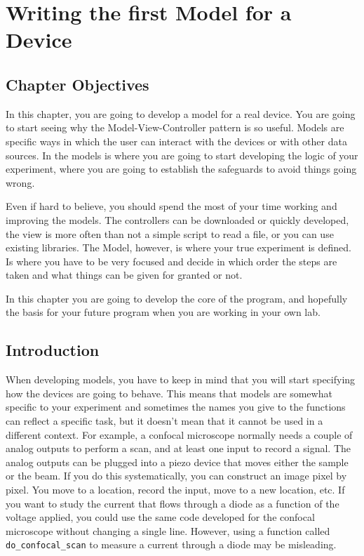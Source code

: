 \chapter{Writing the first Model for a Device}\label{writing-the-first-model-for-adevice}

\section{Chapter Objectives}\label{chapterobjectives}

In this chapter, you are going to develop a model for a real device. You
are going to start seeing why the Model-View-Controller pattern is so
useful. Models are specific ways in which the user can interact with the
devices or with other data sources. In the models is where you are going
to start developing the logic of your experiment, where you are going to
establish the safeguards to avoid things going wrong.

Even if hard to believe, you should spend the most of your time working
and improving the models. The controllers can be downloaded or quickly
developed, the view is more often than not a simple script to read a
file, or you can use existing libraries. The Model, however, is where
your true experiment is defined. Is where you have to be very focused
and decide in which order the steps are taken and what things can be
given for granted or not.

In this chapter you are going to develop the core of the program, and
hopefully the basis for your future program when you are working in your
own lab.

\section{Introduction}\label{introduction}

When developing models, you have to keep in mind that you will start
specifying how the devices are going to behave. This means that models
are somewhat specific to your experiment and sometimes the names you
give to the functions can reflect a specific task, but it doesn't mean
that it cannot be used in a different context. For example, a confocal
microscope normally needs a couple of analog outputs to perform a scan,
and at least one input to record a signal. The analog outputs can be
plugged into a piezo device that moves either the sample or the beam. If
you do this systematically, you can construct an image pixel by pixel.
You move to a location, record the input, move to a new location, etc.
If you want to study the current that flows through a diode as a
function of the voltage applied, you could use the same code developed
for the confocal microscope without changing a single line. However,
using a function called \texttt{do_confocal_scan} to measure a current
through a diode may be misleading.

